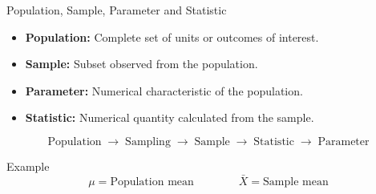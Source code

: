 \documentclass{beamer}
\begin{document}
\begin{frame}{Population, Sample, Parameter and Statistic}

\begin{itemize}
    \item \textbf{Population:} Complete set of units or outcomes of interest.
    
    \item \textbf{Sample:} Subset observed from the population.
    
    \item \textbf{Parameter:} Numerical characteristic of the population.
    
    \item \textbf{Statistic:} Numerical quantity calculated from the sample.
\end{itemize}

\vspace{0.35cm}

\begin{center}
\[
\text{Population}
\;\longrightarrow\;
\text{Sampling}
\;\longrightarrow\;
\text{Sample}
\;\longrightarrow\;
\text{Statistic}
\;\longrightarrow\;
\text{Parameter}
\]
\end{center}

\vspace{0.2cm}

\begin{block}{Example}
\[
\mu = \text{Population mean}
\qquad\qquad
\bar{X} = \text{Sample mean}
\]
\end{block}

\end{frame}

\end{document}
